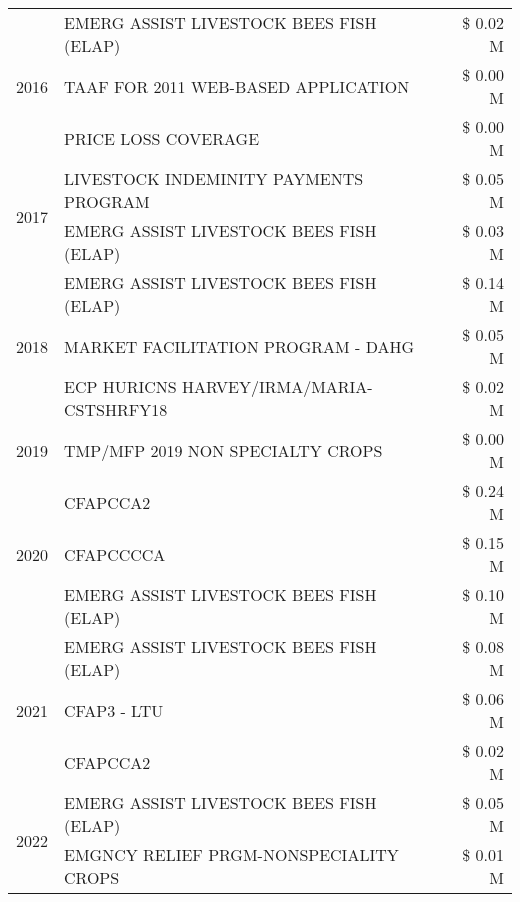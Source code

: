 \begin{tabular}{llr}
\cline{1-3}
\multirow[t]{3}{*}{2016} & EMERG ASSIST LIVESTOCK BEES FISH (ELAP) & \$ 0.02 M \\
 & TAAF FOR 2011 WEB-BASED APPLICATION & \$ 0.00 M \\
 & PRICE LOSS COVERAGE & \$ 0.00 M \\
\cline{1-3}
\multirow[t]{2}{*}{2017} & LIVESTOCK INDEMINITY PAYMENTS PROGRAM & \$ 0.05 M \\
 & EMERG ASSIST LIVESTOCK BEES FISH (ELAP) & \$ 0.03 M \\
\cline{1-3}
\multirow[t]{3}{*}{2018} & EMERG ASSIST LIVESTOCK BEES FISH (ELAP) & \$ 0.14 M \\
 & MARKET FACILITATION PROGRAM - DAHG & \$ 0.05 M \\
 & ECP HURICNS HARVEY/IRMA/MARIA-CSTSHRFY18 & \$ 0.02 M \\
\cline{1-3}
2019 & TMP/MFP 2019 NON SPECIALTY CROPS & \$ 0.00 M \\
\cline{1-3}
\multirow[t]{3}{*}{2020} & CFAPCCA2 & \$ 0.24 M \\
 & CFAPCCCCA & \$ 0.15 M \\
 & EMERG ASSIST LIVESTOCK BEES FISH (ELAP) & \$ 0.10 M \\
\cline{1-3}
\multirow[t]{3}{*}{2021} & EMERG ASSIST LIVESTOCK BEES FISH (ELAP) & \$ 0.08 M \\
 & CFAP3 - LTU & \$ 0.06 M \\
 & CFAPCCA2 & \$ 0.02 M \\
\cline{1-3}
\multirow[t]{2}{*}{2022} & EMERG ASSIST LIVESTOCK BEES FISH (ELAP) & \$ 0.05 M \\
 & EMGNCY RELIEF PRGM-NONSPECIALITY CROPS & \$ 0.01 M \\
\cline{1-3}
\bottomrule
\end{tabular}
